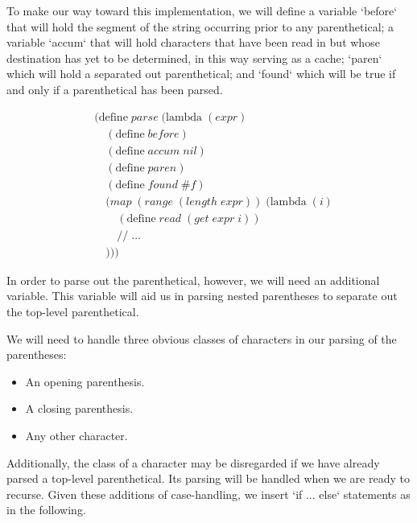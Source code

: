 To make our way toward this implementation, we will define a variable `before` that will 
hold the segment of the string occurring prior to any parenthetical; a variable `accum` 
that will hold characters that have been read in but whose destination has yet to be 
determined, in this way serving as a cache; `paren` which will hold a separated out 
parenthetical; and `found` which will be true if and only if a parenthetical has been 
parsed.

\begin{align*}
& (\text{define} \; parse \; (\text{lambda} \; (expr) \; 
\\& \quad (\text{define} \; before)
\\& \quad (\text{define} \; accum \; nil)
\\& \quad (\text{define} \; paren)
\\& \quad (\text{define} \; found \; \#f)
\\& \quad (map \; (range \; (length \; expr)) \; (\text{lambda} \; (i)
\\& \qquad (\text{define} \; read \; (get \; expr \; i))
\\& \qquad // \; \dots
\\& \quad )))
\end{align*}

In order to parse out the parenthetical, however, we will need an additional variable. 
This variable will aid us in parsing nested parentheses to separate out the top-level parenthetical.

We will need to handle three obvious classes of characters in our parsing of the parentheses:

\begin{itemize}
  \item An opening parenthesis.
  \item A closing parenthesis.
  \item Any other character.
\end{itemize}

Additionally, the class of a character may be disregarded if we have already parsed a 
top-level parenthetical. Its parsing will be handled when we are ready to recurse. Given 
these additions of case-handling, we insert `if ... else` statements as in the following.

